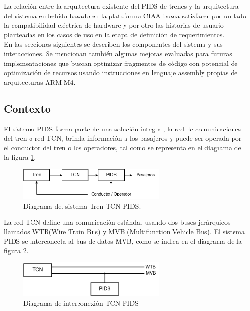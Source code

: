La relación entre la arquitectura existente del PIDS de trenes y la arquitectura del sistema embebido basado en la plataforma CIAA busca satisfacer por un lado la compatibilidad eléctrica de hardware y por otro las historias de usuario planteadas en los casos de uso en la etapa de definición de requerimientos. \\

En las secciones siguientes se describen los componentes del sistema y sus interacciones. Se mencionan también algunas mejoras evaluadas para futuras implementaciones que buscan optimizar fragmentos de código con potencial de optimización de recursos usando instrucciones en lenguaje assembly propias de arquitecturas ARM M4.\\

\subsection{Contexto}

El sistema PIDS forma parte de una solución integral, la red de comunicaciones del tren o red TCN, brinda información a los pasajeros y puede ser operada por el conductor del tren o los operadores, tal como se representa en el diagrama de la figura \ref{fig:diagTrenTcnPids}.\\

\begin{figure}[ht]
	\centering
	\includegraphics[width=0.66\textwidth]{./Figures/diagTrenTcnPids.png}
	\caption{Diagrama del sistema Tren-TCN-PIDS.}
	\label{fig:diagTrenTcnPids}
\end{figure}

La red TCN define una comunicación estándar usando dos buses jerárquicos llamados WTB(Wire Train Bus) y MVB (Multifunction Vehicle Bus). El sistema PIDS se interconecta al bus de datos MVB, como se indica en el diagrama de la figura \ref{fig:diagTcnPidsBuusesWtbMvb}.\\


\begin{figure}[ht]
	\centering
	\includegraphics[width=0.66\textwidth]{./Figures/diagTcnPidsBusesWtbMvb.png}
	\caption{Diagrama de interconexión TCN-PIDS}
	\label{fig:diagTcnPidsBuusesWtbMvb}
\end{figure}

